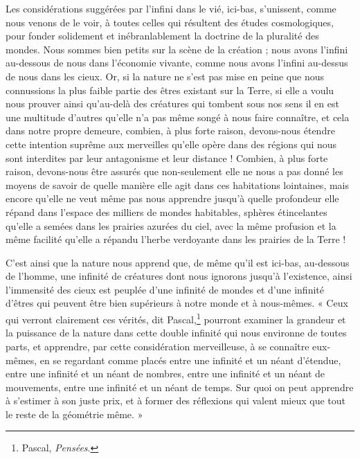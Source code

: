 \documentclass[a4paper, 11pt, oneside]{article}
\begin{document}
Les considérations suggérées par l'infini dans le vié, ici-bas, s'unissent, comme nous venons de le voir, à toutes celles qui résultent des études cosmologiques, pour fonder solidement et inébranlablement la doctrine de la pluralité des mondes. Nous sommes bien petits sur la scène de la création ; nous avons l'infini au-dessous de nous dans l'économie vivante, comme nous avons l'infini au-dessus de nous dans les cieux. Or, si la nature ne s'est pas mise en peine que nous connussions la plus faible partie des êtres existant sur la Terre, si elle a voulu nous prouver ainsi qu'au-delà des créatures qui tombent sous nos sens il en est une multitude d'autres qu'elle n'a pas même songé à nous faire connaître, et cela dans notre propre demeure, combien, à plus forte raison, devons-nous étendre cette intention suprême aux merveilles qu'elle opère dans des régions qui nous sont interdites par leur antagonisme et leur distance ! Combien, à plus forte raison, devons-nous être assurés que non-seulement elle ne nous a pas donné les moyens de savoir de quelle manière elle agit dans ces habitations lointaines, mais encore qu'elle ne veut même pas nous apprendre jusqu'à quelle profondeur elle répand dans l'espace des milliers de mondes habitables, sphères étincelantes qu'elle a semées dans les prairies azurées du ciel, avec la même profusion et la même facilité qu'elle a répandu l'herbe verdoyante dans les prairies de la Terre !

C'est ainsi que la nature nous apprend que, de même qu'il est ici-bas, au-dessous de l'homme, une infinité de créatures dont nous ignorons jusqu'à l'existence, ainsi l'immensité des cieux est peuplée d'une infinité de mondes et d'une infinité d'êtres qui peuvent être bien supérieurs à notre monde et à nous-mêmes. « Ceux qui verront clairement ces vérités, dit Pascal,\footnote{Pascal, \emph{Pensées}.} pourront examiner la grandeur et la puissance de la nature dans cette double infinité qui nous environne de toutes parts, et apprendre, par cette considération merveilleuse, à se connaître eux-mêmes, en se regardant comme placés entre une infinité et un néant d'étendue, entre une infinité et un néant de nombres, entre une infinité et un néant de mouvements, entre une infinité et un néant de temps. Sur quoi on peut apprendre à s'estimer à son juste prix, et à former des réflexions qui valent mieux que tout le reste de la géométrie même. »
\end{document}
